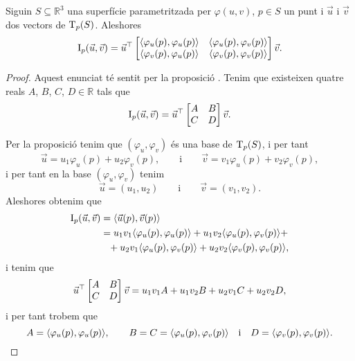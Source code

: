 \documentclass[../../Main.tex]{subfiles}
\begin{document}
	\begin{proposition}
		\label{prop:coeficients de la primera forma fonamental}
		Siguin \(S\subseteq\mathbb{R}^{3}\) una superfície parametritzada per \(\varphi(u,v)\), \(p\in S\) un punt i \(\vec{u}\) i \(\vec{v}\) dos vectors de \(\operatorname{T}_{p}(S)\). Aleshores
		\[\I_{p}(\vec{u},\vec{v})=\vec{u}^{\transposta}\begin{bmatrix}
			\prodesc{\varphi_{u}(p)}{\varphi_{u}(p)} & \prodesc{\varphi_{u}(p)}{\varphi_{v}(p)} \\
			\prodesc{\varphi_{v}(p)}{\varphi_{u}(p)} & \prodesc{\varphi_{v}(p)}{\varphi_{v}(p)}
		\end{bmatrix}\vec{v}.\]
		\begin{proof}
			Aquest enunciat té sentit per la proposició . Tenim que existeixen quatre reals \(A\), \(B\), \(C\), \(D\in\mathbb{R}\) tals que
			\[\I_{p}(\vec{u},\vec{v})=\vec{u}^{\transposta}\begin{bmatrix}
				A & B \\
				C & D
			\end{bmatrix}\vec{v}.\]
			
			Per la proposició  tenim que \((\varphi_{u},\varphi_{v})\) és una base de \(\operatorname{T}_{p}(S)\), i per tant
			\[
			    \vec{u}=u_{1}\varphi_{u}(p)+u_{2}\varphi_{v}(p),\qquad\text{i}\qquad\vec{v}=v_{1}\varphi_{u}(p)+v_{2}\varphi_{v}(p),
			\]
			i per tant en la base \((\varphi_{u},\varphi_{v})\) tenim
			\[
			    \vec{u}=(u_{1},u_{2})\qquad\text{i}\qquad\vec{v}=(v_{1},v_{2}).
			\]
			Aleshores obtenim que
			\begin{align*}
				\I_{p}(\vec{u},\vec{v})&=\prodesc{\vec{u}(p)}{\vec{v}(p)} \\
				&=u_{1}v_{1}\prodesc{\varphi_{u}(p)}{\varphi_{u}(p)}+u_{1}v_{2}\prodesc{\varphi_{u}(p)}{\varphi_{v}(p)}+\\
				&\phantom{=}+u_{2}v_{1}\prodesc{\varphi_{u}(p)}{\varphi_{v}(p)}+u_{2}v_{2}\prodesc{\varphi_{v}(p)}{\varphi_{v}(p)},
			\end{align*}
			i tenim que
			\[\vec{u}^{\top}\begin{bmatrix}
				A & B \\
				C & D
			\end{bmatrix}\vec{v}=u_{1}v_{1}A+u_{1}v_{2}B+u_{2}v_{1}C+u_{2}v_{2}D,\]
			i per tant trobem que
			\[
			    A=\prodesc{\varphi_{u}(p)}{\varphi_{u}(p)},\qquad B=C=\prodesc{\varphi_{u}(p)}{\varphi_{v}(p)}\quad\text{i}\quad D=\prodesc{\varphi_{v}(p)}{\varphi_{v}(p)}.\qedhere
			\]
		\end{proof}
	\end{proposition}
\end{document}
